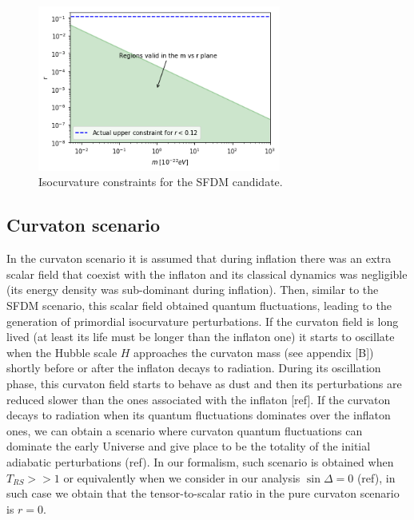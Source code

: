 \documentclass[twocolumn,           %
               showpacs,            %
               preprintnumbers,     %
               aps,                 %
               prl,          	    %
               letterpaper,             %
               superscriptaddress,      %
               nofootinbib,         %
               tightenlines,        %
               floats,floatfix      %
               ,usenatbib,
               ]{revtex4-1}
\begin{document}
\begin{figure}
\includegraphics[width=8cm]{SFDMconstraints.png}
\caption{Isocurvature constraints for the SFDM candidate.}\label{constraintsSFDM}
\end{figure}

\subsection{Curvaton scenario}

In the curvaton scenario it is assumed that during inflation there was an extra scalar field that coexist with the inflaton and its classical dynamics was negligible (its energy density was sub-dominant during inflation). Then, similar to the SFDM scenario, this scalar field obtained quantum fluctuations, leading to the generation of primordial isocurvature perturbations. If the curvaton field is long lived (at least its life must be longer than the inflaton one) it starts to oscillate when the Hubble scale $H$ approaches the curvaton mass (see appendix [B]) shortly before or after the inflaton decays to radiation. During its oscillation phase, this curvaton field starts to behave as dust and then its perturbations are reduced slower than the ones associated with the inflaton [ref]. If the curvaton decays to radiation when its quantum fluctuations dominates over the inflaton ones, we can obtain a scenario where curvaton quantum fluctuations can dominate the early Universe and give place to be the totality of the initial adiabatic perturbations (ref). In our formalism, such scenario is obtained when $T_{RS}>>1$ or equivalently when we consider in our analysis $\sin\Delta = 0$ (ref), in such case we obtain that the tensor-to-scalar ratio in the pure curvaton scenario is $r=0$.  
\end{document}
